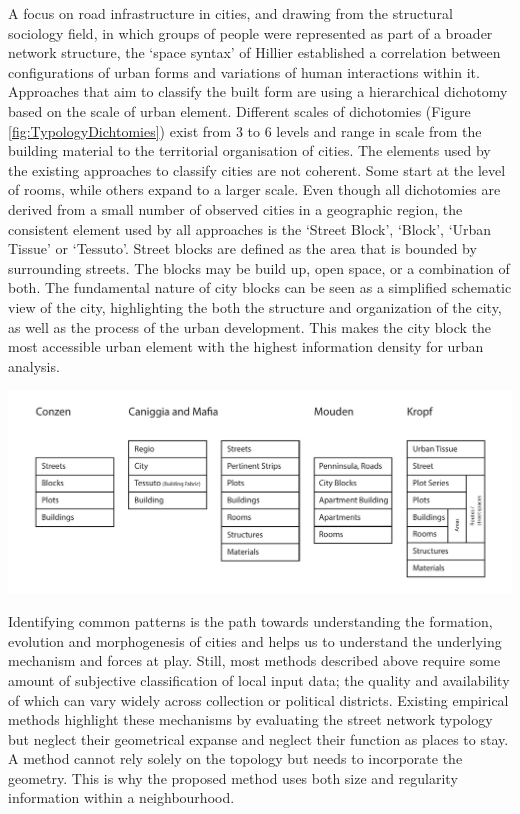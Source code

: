 \documentclass{nature}
\makeatletter
\renewenvironment*{figure}{\@float{figure}}{\end@float}
\makeatother
\begin{document}
A focus on road infrastructure in cities, and drawing from the structural sociology field, in which groups of people were represented as part of a broader network structure, the `space syntax' of Hillier\cite{Hillier1996} established a correlation between configurations of urban forms and variations of human interactions within it.  Approaches that aim to classify the built form are using a hierarchical dichotomy based on the scale of urban element. Different scales of dichotomies (Figure \ref{fig:TypologyDichtomies}) exist from 3 to 6 levels and range in scale from the building material to the territorial organisation of cities\cite{Lynch1981,Conzen1960,Caniggi1979,Castex1980,Mouden1988,Allain2004}. The elements used by the existing approaches to classify cities are not coherent. Some start at the level of rooms, while others expand to a larger scale. Even though all dichotomies are derived from a small number of observed cities in a geographic region, the consistent element used by all approaches is the `Street Block', `Block', `Urban Tissue' or `Tessuto'. Street blocks are defined as the area that is bounded by surrounding streets. The blocks may be build up, open space, or a combination of both. The fundamental nature of city blocks can be seen as a simplified schematic view of the city\cite{Southworth2013}, highlighting the both the structure and organization of the city, as well as the process of the urban development. This makes the city block the most accessible urban element with the highest information density for urban analysis.  

\begin{figure}
\centering    
\includegraphics[scale=0.80,page=1]{Images/Typology_Dichtomies.pdf}  
\caption{\bf Different scales of dichotomies. }    
 \label{fig:TypologyDichtomies}  
\end{figure} 

Identifying common patterns is the path towards understanding the formation, evolution and morphogenesis of cities and helps us to understand the underlying mechanism and forces at play. Still, most methods described above require some amount of subjective classification of local input data; the quality and availability of which can vary widely across collection or political districts. Existing empirical methods highlight these mechanisms by evaluating the street network typology\cite{Hillier1989} but neglect their geometrical expanse and neglect their function as places to stay.  A method cannot rely solely on the topology but needs to incorporate the geometry\cite{Louf2014a}. This is why the proposed method uses both size and regularity information within a neighbourhood.  
\end{document}
